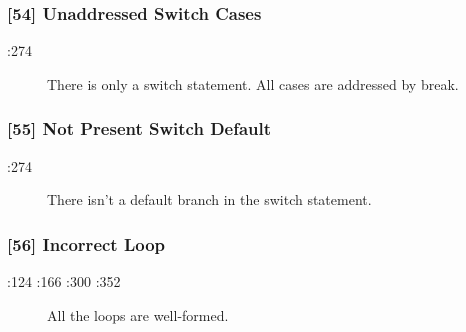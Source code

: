 \subsubsection{[54] Unaddressed Switch Cases}
\begin{description}
	\item[:274] There is only a switch statement. All cases are addressed by break.
\end{description}
\subsubsection{[55] Not Present Switch Default}
\begin{description}
	\item[:274] There isn't a default branch in the switch statement.
\end{description}
\subsubsection{[56] Incorrect Loop}
\begin{description}
	\item[:124 :166 :300 :352] All the loops are well-formed.
\end{description}